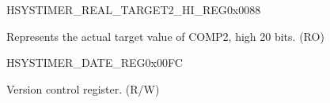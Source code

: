 \begin{register}{H}{SYSTIMER\_REAL\_TARGET2\_HI\_REG}{0x0088}\label{regdesc:SYSTIMERREALTARGET2HIREG}
%
%
\regnewline%
\begin{regdesc}\begin{reglist}
\label{fielddesc:SYSTIMERTARGET2HIRO}\item [SYSTIMER\_TARGET2\_HI\_RO] Represents the actual target value of COMP2, high 20 bits. (RO)
\end{reglist}\end{regdesc}
\end{register}


\begin{register}{H}{SYSTIMER\_DATE\_REG}{0x00FC}\label{regdesc:SYSTIMERDATEREG}
%
%
%
\regnewline%
\begin{regdesc}\begin{reglist}
\label{fielddesc:SYSTIMERDATE}\item [SYSTIMER\_DATE] Version control register. (R/W)
\end{reglist}\end{regdesc}
\end{register}


